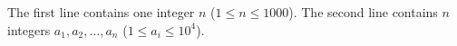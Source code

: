 The first line contains one integer $n$ ($1 \le n \le 1000$).
The second line contains $n$ integers $a_1, a_2, \ldots, a_n$ ($1 \le a_i \le 10^4$).
